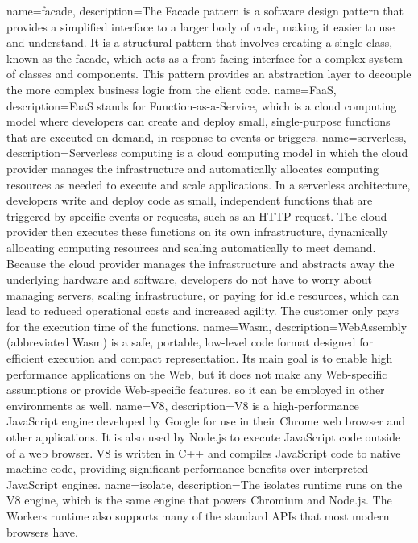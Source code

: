 {
    name=facade,
    description={The Facade pattern is a software design pattern that provides a simplified interface to a larger body of code, making it easier to use and understand. It is a structural pattern that involves creating a single class, known as the facade, which acts as a front-facing interface for a complex system of classes and components. This pattern provides an abstraction layer to decouple the more complex business logic from the client code.}
}
{
    name=FaaS,
    description={FaaS stands for Function-as-a-Service, which is a cloud computing model where developers can create and deploy small, single-purpose functions that are executed on demand, in response to events or triggers.}
}
{
    name=serverless,
    description={Serverless computing is a cloud computing model in which the cloud provider manages the infrastructure and automatically allocates computing resources as needed to execute and scale applications. In a serverless architecture, developers write and deploy code as small, independent functions that are triggered by specific events or requests, such as an HTTP request. The cloud provider then executes these functions on its own infrastructure, dynamically allocating computing resources and scaling automatically to meet demand. Because the cloud provider manages the infrastructure and abstracts away the underlying hardware and software, developers do not have to worry about managing servers, scaling infrastructure, or paying for idle resources, which can lead to reduced operational costs and increased agility. The customer only pays for the execution time of the functions.}
}
{
    name=Wasm,
    description={WebAssembly (abbreviated Wasm) is a safe, portable, low-level code format designed for efficient execution and compact representation. Its main goal is to enable high performance applications on the Web, but it does not make any Web-specific assumptions or provide Web-specific features, so it can be employed in other environments as well.}
}
{
    name=V8,
    description={V8 is a high-performance JavaScript engine developed by Google for use in their Chrome web browser and other applications. It is also used by Node.js to execute JavaScript code outside of a web browser. V8 is written in C++ and compiles JavaScript code to native machine code, providing significant performance benefits over interpreted JavaScript engines.}
}
{
    name=isolate,
    description={The isolates runtime runs on the V8 engine, which is the same engine that powers Chromium and Node.js. The Workers runtime also supports many of the standard APIs that most modern browsers have.}
}
